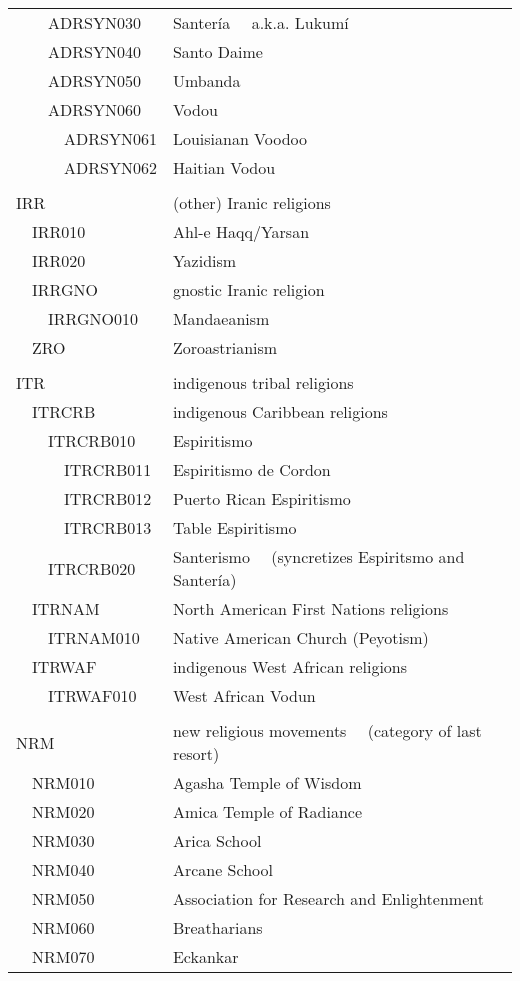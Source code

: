 \documentclass[12pt]{article}
\begin{document}
\begin{tiny}
\begin{center}
\begin{longtable}{|l|l|}
~~~~ADRSYN030 & Santería	~~a.k.a. Lukumí \\
~~~~ADRSYN040 & Santo Daime \\
~~~~ADRSYN050 & Umbanda \\
~~~~ADRSYN060 & Vodou \\
~~~~~~ADRSYN061 & Louisianan Voodoo \\
~~~~~~ADRSYN062 & Haitian Vodou \\
 \\
{\normalsize IRR } & {\normalsize (other) Iranic religions } \\
~~IRR010 & Ahl-e Haqq/Yarsan \\
~~IRR020 & Yazidism \\
~~IRRGNO & gnostic Iranic religion \\
~~~~IRRGNO010 & Mandaeanism \\
~~ZRO & Zoroastrianism \\
 \\
{\normalsize ITR } & {\normalsize indigenous tribal religions } \\
~~ITRCRB & indigenous Caribbean religions \\
~~~~ITRCRB010 & Espiritismo \\
~~~~~~ITRCRB011 & Espiritismo de Cordon \\
~~~~~~ITRCRB012 & Puerto Rican Espiritismo \\
~~~~~~ITRCRB013 & Table Espiritismo \\
~~~~ITRCRB020 & Santerismo	~~(syncretizes Espiritsmo and Santería) \\
~~ITRNAM & North American First Nations religions \\
~~~~ITRNAM010 & Native American Church (Peyotism) \\
~~ITRWAF & indigenous West African religions \\
~~~~ITRWAF010 & West African Vodun \\
 \\
{\normalsize NRM } & {\normalsize new religious movements	~~(category of last resort) } \\
~~NRM010 & Agasha Temple of Wisdom \\
~~NRM020 & Amica Temple of Radiance \\
~~NRM030 & Arica School \\
~~NRM040 & Arcane School \\
~~NRM050 & Association for Research and Enlightenment \\
~~NRM060 & Breatharians \\
~~NRM070 & Eckankar \\

\end{longtable}
\end{center}
\end{tiny}
\end{document}
